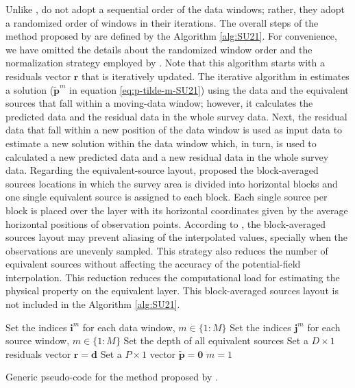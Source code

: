 Unlike \cite{leao-silva1989}, \cite{soler-uieda2021} do not adopt a sequential order of the data windows; 
rather, they adopt a randomized order of windows in their  iterations.
The overall steps of the method proposed by \cite{soler-uieda2021} are defined by the Algorithm \ref{alg:SU21}.
For convenience, we have omitted  the details about the randomized window order and the normalization strategy 
employed by \cite{soler-uieda2021}. 
Note that this algorithm starts with a residuals vector $\mathbf{r}$ that is iteratively updated.
The  iterative algorithm in \cite{soler-uieda2021} estimates a solution 
($\tilde{\mathbf{p}}^{m}$ in equation \ref{eq:p-tilde-m-SU21}) using the data and 
the equivalent sources that fall within a moving-data window; however, it calculates the predicted data and 
the residual data in the whole survey data. 
Next, the residual data  that fall within a new position of the data window is used as input data to estimate a new 
solution within the data window which, in turn, is used to calculated a new predicted data and a new residual data 
in the whole survey data.
Regarding the equivalent-source layout, \cite{soler-uieda2021} proposed the block-averaged sources locations 
in which the survey area is divided into horizontal blocks and one single equivalent source is assigned to each block. 
Each single source per block is placed over the layer with its horizontal coordinates given by the average horizontal 
positions of observation points. 
According to \cite{soler-uieda2021}, the block-averaged sources layout may prevent aliasing of the interpolated 
values, specially when the observations are unevenly sampled.
This strategy also reduces the number of equivalent sources without affecting the accuracy of the potential-field interpolation. 
This reduction reduces the computational load for estimating the physical property on the equivalent layer.
This block-averaged sources layout is not included in the Algorithm \ref{alg:SU21}.


\begin{algorithm}
	\Input{}
	Set the indices $\mathbf{i}^{m}$ for each data window, $m \in \{ 1 : M \}$ \;
	Set the indices $\mathbf{j}^{m}$ for each source window, $m \in \{ 1 : M \}$ \;
	Set the depth of all equivalent sources \;
	Set a $D \times 1$ residuals vector $\mathbf{r} = \mathbf{d}$ \;
	Set a $P \times 1$ vector $\tilde{\mathbf{p}} = \mathbf{0}$ \;
	$m = 1$ \;
	\caption{Generic pseudo-code for the method proposed by \cite{soler-uieda2021}.}
	\label{alg:SU21}
\end{algorithm}

